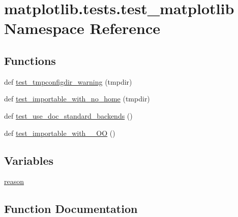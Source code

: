 \hypertarget{namespacematplotlib_1_1tests_1_1test__matplotlib}{}\section{matplotlib.\+tests.\+test\+\_\+matplotlib Namespace Reference}
\label{namespacematplotlib_1_1tests_1_1test__matplotlib}
\subsection*{Functions}
\begin{DoxyCompactItemize}
\item 
def \hyperlink{namespacematplotlib_1_1tests_1_1test__matplotlib_a4d4526818e26d4f1667c579af7dbdce9}{test\+\_\+tmpconfigdir\+\_\+warning} (tmpdir)
\item 
def \hyperlink{namespacematplotlib_1_1tests_1_1test__matplotlib_a437725575430953f2177cd9e446d099e}{test\+\_\+importable\+\_\+with\+\_\+no\+\_\+home} (tmpdir)
\item 
def \hyperlink{namespacematplotlib_1_1tests_1_1test__matplotlib_aafdbe9f1d153c8781273b1488931a1ca}{test\+\_\+use\+\_\+doc\+\_\+standard\+\_\+backends} ()
\item 
def \hyperlink{namespacematplotlib_1_1tests_1_1test__matplotlib_af637d2d414f5485b32d79ad4c9ddf4f2}{test\+\_\+importable\+\_\+with\+\_\+\+\_\+\+OO} ()
\end{DoxyCompactItemize}
\subsection*{Variables}
\begin{DoxyCompactItemize}
\item 
\hyperlink{namespacematplotlib_1_1tests_1_1test__matplotlib_a157ee66e33c6428f4bdec8e22b4cffec}{reason}
\end{DoxyCompactItemize}


\subsection{Function Documentation}
\mbox{\label{namespacematplotlib_1_1tests_1_1test__matplotlib_af637d2d414f5485b32d79ad4c9ddf4f2}} 
